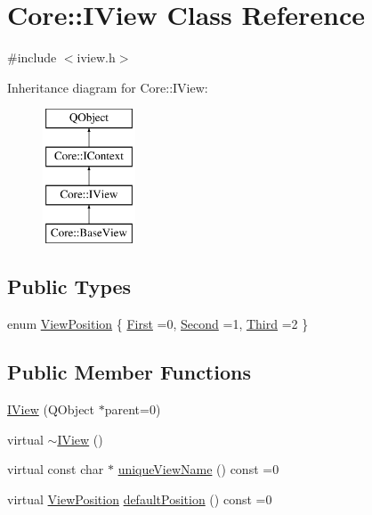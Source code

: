 \hypertarget{class_core_1_1_i_view}{\section{Core\-:\-:I\-View Class Reference}
\label{class_core_1_1_i_view}
}


{\ttfamily \#include $<$iview.\-h$>$}

Inheritance diagram for Core\-:\-:I\-View\-:\begin{figure}[H]
\begin{center}
\leavevmode
\includegraphics[height=4.000000cm]{class_core_1_1_i_view}
\end{center}
\end{figure}
\subsection*{Public Types}
\begin{DoxyCompactItemize}
\item 
enum \hyperlink{group___core_plugin_ga2423997830c6fd1ceb278f80dcbfc010}{View\-Position} \{ \hyperlink{group___core_plugin_gga2423997830c6fd1ceb278f80dcbfc010a82ca3e04bf84362ecb9b889c6bdc6980}{First} =0, 
\hyperlink{group___core_plugin_gga2423997830c6fd1ceb278f80dcbfc010ae792ce1c0a152bc3cd353f3877c09d59}{Second} =1, 
\hyperlink{group___core_plugin_gga2423997830c6fd1ceb278f80dcbfc010abeaccba28ffbb72a779d3e298bb60e4d}{Third} =2
 \}
\end{DoxyCompactItemize}
\subsection*{Public Member Functions}
\begin{DoxyCompactItemize}
\item 
\hyperlink{group___core_plugin_gac77184abef47462a8a74a11c30356003}{I\-View} (Q\-Object $\ast$parent=0)
\item 
virtual \hyperlink{group___core_plugin_gad118ee9239c2009d156450064c6a89f1}{$\sim$\-I\-View} ()
\item 
virtual const char $\ast$ \hyperlink{group___core_plugin_ga122f26e5b4bd91ad1e8c38f0b4573870}{unique\-View\-Name} () const =0
\item 
virtual \hyperlink{group___core_plugin_ga2423997830c6fd1ceb278f80dcbfc010}{View\-Position} \hyperlink{group___core_plugin_ga452979cceabf4890999b3fa0f9a248c3}{default\-Position} () const =0
\end{DoxyCompactItemize}


